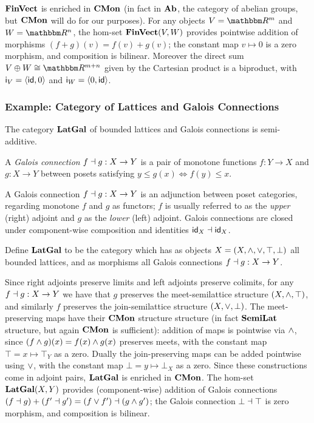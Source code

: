 $\mathbf{FinVect}$ is enriched in $\mathbf{CMon}$ (in fact in $\mathbf{Ab}$, the category of abelian groups, but $\mathbf{CMon}$ will do for
our purposes). For any objects $V = \RR^m$ and $W = \RR^n$, the hom-set $\mathbf{FinVect}(V,W)$ provides pointwise
addition of morphisms $(f + g)(v) = f(v) + g(v)$; the constant map $v \mapsto 0$ is a zero morphism, and
composition is bilinear. Moreover the direct sum $V \biprod W \iso \RR^{m + n}$ given by the Cartesian product
is a biproduct, with $\mathsf{i}_{V} = \langle \mathsf{id}, 0\rangle$ and $\mathsf{i}_{W} = \langle 0, \mathsf{id}\rangle$.

\subsubsection{Example: Category of Lattices and Galois Connections}

The category $\mathbf{LatGal}$ of bounded lattices and Galois connections is semi-additive.

\begin{definition}
A \emph{Galois connection} $f \dashv g: X \to Y$ is a pair of monotone functions $f: Y \to X$ and $g: X \to Y$
between posets satisfying $y \leq g(x) \iff f(y) \leq x$.
\end{definition}

\noindent A Galois connection $f \dashv g: X \to Y$ is an adjunction between poset categories, regarding
monotone $f$ and $g$ as functors; $f$ is usually referred to as the \emph{upper} (right) adjoint and $g$ as
the \emph{lower} (left) adjoint. Galois connections are closed under component-wise composition and identities
$\mathsf{id}_X \dashv \mathsf{id}_X$.

\begin{definition}
Define $\mathbf{LatGal}$ to be the category which has as objects $X = (X, \wedge, \vee, \top, \bot)$ all bounded
lattices, and as morphisms all Galois connections $f \dashv g: X \to Y$.
\end{definition}

\noindent Since right adjoints preserve limits and left adjoints preserve colimits, for any $f \dashv g: X \to
Y$ we have that $g$ preserves the meet-semilattice structure $(X, \wedge, \top)$, and similarly $f$ preserves
the join-semilattice structure $(X, \vee, \bot)$. The meet-preserving maps have their $\mathbf{CMon}$ structure
structure (in fact $\mathbf{SemiLat}$ structure, but again $\mathbf{CMon}$ is sufficient): addition of maps is pointwise via
$\wedge$, since $(f \wedge g)(x) = f(x) \wedge g(x)$ preserves meets, with the constant map $\top = x \mapsto
\top_Y$ as a zero. Dually  the join-preserving maps can be added pointwise using $\vee$, with the constant
map $\bot = y \mapsto \bot_X$ as a zero. Since these constructions come in adjoint pairs, $\mathbf{LatGal}$ is
enriched in $\mathbf{CMon}$. The hom-set $\mathbf{LatGal}(X,Y)$ provides (component-wise) addition of Galois connections $(f
\dashv g) + (f' \dashv g') = (f \vee f') \dashv (g \wedge g')$; the Galois connection $\bot \dashv \top$ is zero
morphism, and composition is bilinear.

